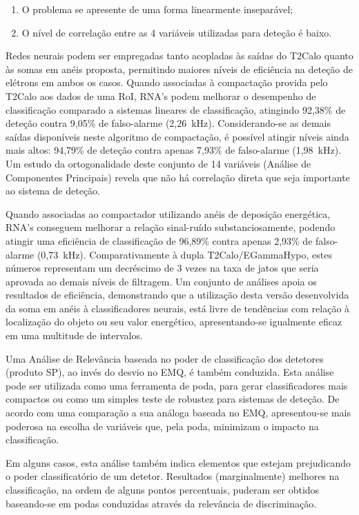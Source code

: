\begin{enumerate}
\item O problema se apresente de uma forma linearmente inseparável;
\item O nível de correlação entre as 4 variáveis utilizadas para deteção é
baixo.
\end{enumerate}

Redes neurais podem ser empregadas tanto acopladas às saídas do T2Calo quanto
às somas em anéis proposta, permitindo maiores níveis de eficiência na deteção
de elétrons em ambos os casos. Quando associadas à compactação provida pelo
T2Calo aos dados de uma RoI, RNA's podem melhorar o desempenho de
classificação comparado a sistemas lineares de classificação, atingindo
92,38\% de deteção contra 9,05\% de falso-alarme (2,26~kHz). Considerando-se
as demais saídas disponíveis neste algoritmo de compactação, é possível
atingir níveis ainda mais altos: 94,79\% de deteção contra apenas 7,93\% de
falso-alarme (1,98~kHz). Um estudo da ortogonalidade deste conjunto de 14
variáveis (Análise de Componentes Principais) revela que não há correlação
direta que seja importante ao sistema de deteção.

Quando associadas ao compactador utilizando anéis de deposição energética,
RNA's conseguem melhorar a relação sinal-ruído substanciosamente, podendo
atingir uma eficiência de classificação de 96,89\% contra apenas 2,93\% de
falso-alarme (0,73~kHz). Comparativamente à dupla T2Calo/EGammaHypo, estes
números representam um decréscimo de 3 vezes na taxa de jatos que seria
aprovada ao demais níveis de filtragem. Um conjunto de análises apoia os
resultados de eficiência, demonstrando que a utilização desta versão
desenvolvida da soma em anéis à classificadores neurais, está livre de
tendências com relação à localização do objeto ou seu valor energético,
apresentando-se igualmente eficaz em uma multitude de intervalos.

Uma Análise de Relevância baseada no poder de classificação dos detetores
(produto SP), ao invés do desvio no EMQ, é também conduzida. Esta análise pode
ser utilizada como uma ferramenta de poda, para gerar classificadores mais
compactos ou como um simples teste de robustez para sistemas de deteção. De
acordo com uma comparação a sua análoga baseada no EMQ, apresentou-se mais
poderosa na escolha de variáveis que, pela poda, minimizam o impacto na
classificação.

Em alguns casos, esta análise também indica elementos que estejam prejudicando
o poder classificatório de um detetor. Resultados (marginalmente) melhores na
classificação, na ordem de alguns pontos percentuais, puderam ser obtidos
baseando-se em podas conduzidas através da relevância de discriminação.


